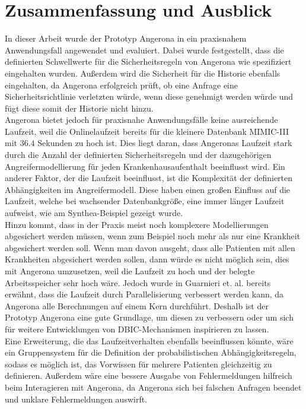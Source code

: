 \documentclass[german,version-2020-11]{uzl-thesis}
\begin{document}
\chapter{Zusammenfassung und Ausblick} \label{chap:Zusammenfassung}
In dieser Arbeit wurde der Prototyp Angerona in ein praxisnahem Anwendungsfall angewendet und evaluiert. Dabei wurde festgestellt, dass die definierten Schwellwerte für die Sicherheitsregeln von Angerona wie spezifiziert eingehalten wurden. Außerdem wird die Sicherheit für die Historie ebenfalls eingehalten, da Angerona erfolgreich prüft, ob eine Anfrage eine Sicherheitsrichtlinie verletzten würde, wenn diese genehmigt werden würde und fügt diese somit der Historie nicht hinzu. \\
Angerona bietet jedoch für praxisnahe Anwendungsfälle keine ausreichende Laufzeit, weil die Onlinelaufzeit bereits für die kleinere Datenbank MIMIC-III mit $36.4$ Sekunden zu hoch ist. Dies liegt daran, dass Angeronas Laufzeit stark durch die Anzahl der definierten Sicherheitsregeln und der dazugehörigen Angreifermodellierung für jeden Krankenhausaufenthalt beeinflusst wird. Ein anderer Faktor, der die Laufzeit beeinflusst, ist die Komplexität der definierten Abhängigkeiten im Angreifermodell. Diese haben einen großen Einfluss auf die Laufzeit, welche bei wachsender Datenbankgröße, eine immer länger Laufzeit aufweist, wie am Synthea-Beispiel gezeigt wurde. \\ 
Hinzu kommt, dass in der Praxis meist noch komplexere Modellierungen abgesichert werden müssen, wenn zum Beispiel noch mehr als nur eine Krankheit abgesichert werden soll. Wenn man davon ausgeht, dass alle Patienten mit allen Krankheiten abgesichert werden sollen, dann würde es nicht möglich sein, dies mit Angerona umzusetzen, weil die Laufzeit zu hoch und der belegte Arbeitsspeicher sehr hoch wäre.
Jedoch wurde in  Guarnieri et. al. \cite{guarnieri2017securing} bereits erwähnt, dass die Laufzeit durch Parallelisierung verbessert werden kann, da Angerona alle Berechnungen auf einem Kern durchführt. Deshalb ist der Prototyp Angerona eine gute Grundlage, um diesen zu verbessern oder um sich für weitere Entwicklungen von DBIC-Mechanismen inspirieren zu lassen. \\ 
Eine Erweiterung, die das Laufzeitverhalten ebenfalls beeinflussen könnte, wäre ein Gruppensystem für die Definition der probabilistischen Abhängigkeitsregeln, sodass es möglich ist, das Vorwissen für mehrere Patienten gleichzeitig zu definieren. Außerdem wäre eine bessere Ausgabe von Fehlermeldungen hilfreich beim Interagieren mit Angerona, da Angerona sich bei falschen Anfragen beendet und unklare Fehlermeldungen auswirft. \\ \\ 
\end{document}
